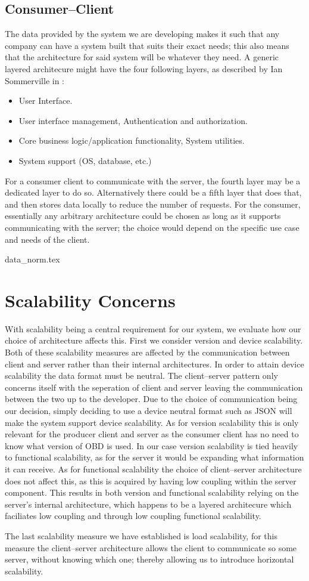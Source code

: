 \subsection{Consumer--Client}
The data provided by the system we are developing makes it such that any company can have a system built that suits their exact needs; this also means that the architecture for said system will be whatever they need.
A generic layered architecure might have the four following layers, as described by Ian Sommerville in \cite{software_engineering}:
\begin{itemize}
    \item User Interface.
    \item User interface management, Authentication and authorization.
    \item Core business logic/application functionality, System utilities.
    \item System support (OS, database, etc.)
\end{itemize}
For a consumer client to communicate with the server, the fourth layer may be a dedicated layer to do so.
Alternatively there could be a fifth layer that does that, and then stores data locally to reduce the number of requests.
For the consumer, essentially any arbitrary architecture could be chosen as long as it supports communicating with the server; 
the choice would depend on the specific use case and needs of the client.

{data_norm.tex}

\section{Scalability Concerns}
With scalability being a central requirement for our system, we evaluate how our choice of architecture affects this.
First we consider version and device scalability.
Both of these scalability measures are affected by the communication between client and server rather than their internal architectures.
In order to attain device scalability the data format must be neutral.
The client--server pattern only concerns itself with the seperation of client and server leaving the communication between the two up to the developer.
Due to the choice of communication being our decision, simply deciding to use a device neutral format such as JSON will make the system support device scalability.
As for version scalability this is only relevant for the producer client and server as the consumer client has no need to know what version of \ac{OBD} is used.
In our case version scalability is tied heavily to functional scalability, as for the server it would be expanding what information it can receive.
As for functional scalability the choice of client--server architecture does not affect this, as this is acquired by having low coupling within the server component.
This results in both version and functional scalability relying on the server's internal architecture, which happens to be a layered architecure which faciliates low coupling and through low coupling functional scalability.

The last scalability measure we have established is load scalability, for this measure the client--server architecture allows the client to communicate so some server, without knowing which one; thereby allowing us to introduce horizontal scalability.
